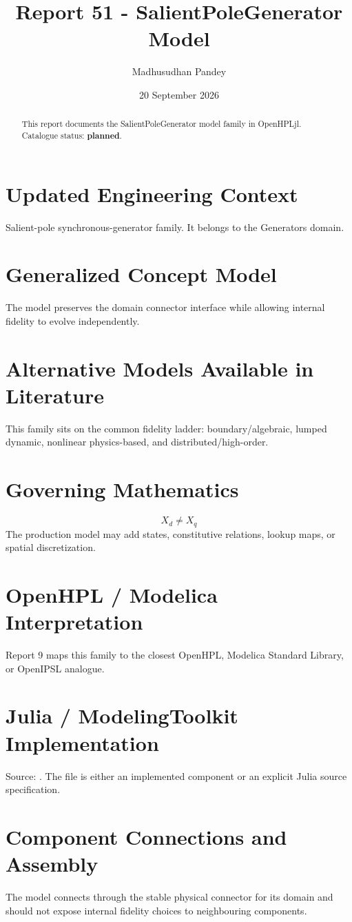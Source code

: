 \documentclass[10pt,a4paper]{article}
\title{Report 51 - SalientPoleGenerator Model}
\author{Madhusudhan Pandey}
\date{20 September 2026}
\begin{document}
\maketitle
\begin{abstract}This report documents the SalientPoleGenerator model family in OpenHPLjl. Catalogue status: \textbf{planned}.\end{abstract}
\section{Updated Engineering Context}Salient-pole synchronous-generator family. It belongs to the Generators domain.
\section{Generalized Concept Model}The model preserves the domain connector interface while allowing internal fidelity to evolve independently.
\section{Alternative Models Available in Literature}This family sits on the common fidelity ladder: boundary/algebraic, lumped dynamic, nonlinear physics-based, and distributed/high-order.
\section{Governing Mathematics}\[X_d\ne X_q\]The production model may add states, constitutive relations, lookup maps, or spatial discretization.
\section{OpenHPL / Modelica Interpretation}Report 9 maps this family to the closest OpenHPL, Modelica Standard Library, or OpenIPSL analogue.
\section{Julia / ModelingToolkit Implementation}Source: \texttt{}. The file is either an implemented component or an explicit Julia source specification.
\section{Component Connections and Assembly}The model connects through the stable physical connector for its domain and should not expose internal fidelity choices to neighbouring components.
\end{document}
